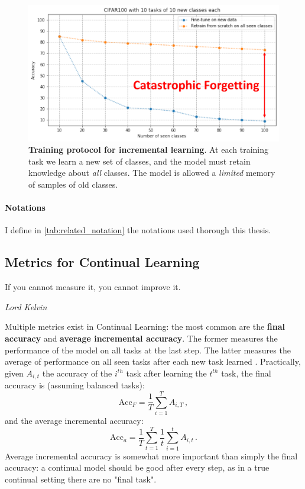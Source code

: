 \begin{figure}[tb]
      \begin{center}
            \includegraphics[width=0.8\linewidth]{images/related/catastrophic_forgetting.pdf}
      \end{center}
      \caption{\textbf{Training protocol for incremental learning}. At each training task we learn a
            new set of classes, and the model must retain knowledge about \textit{all} classes. The
            model is allowed a \textit{limited} memory of samples of old classes.}
      \label{fig:related_forgetting}
\end{figure}

\paragraph{Notations} I define in \autoref{tab:related_notation} the notations used thorough this thesis.



\subsection{Metrics for Continual Learning}
\label{sec:related_metrics}

\epigraph{If you cannot measure it, you cannot improve it.}{\textit{Lord Kelvin}}

Multiple metrics exist in Continual Learning: the most common are the \textbf{final accuracy} and
\textbf{average incremental accuracy}. The former measures the performance of the model on all tasks
at the last step. The latter measures the average of performance on all seen tasks after each new
task learned \citep{rebuffi2017icarl}. Practically, given $A_{i,t}$ the accuracy of the $i^{th}$
task after
learning the $t^{th}$ task, the final accuracy is (assuming balanced tasks):
%
\begin{equation}
      \text{Acc}_F = \frac{1}{T} \sum_{i=1}^T A_{i,T}\,,
      \label{eq:related_final_acc}
\end{equation}
%
and the average incremental accuracy:
%
\begin{equation}
      \text{Acc}_a = \frac{1}{T} \sum_{t=1}^T \frac{1}{t}  \sum_{i=1}^t A_{i,t}\,.
      \label{eq:related_avg_acc}
\end{equation}
%
Average incremental accuracy is somewhat more important than simply the final accuracy: a continual
model should be good after every step, as in a true continual setting there are no "final task".

